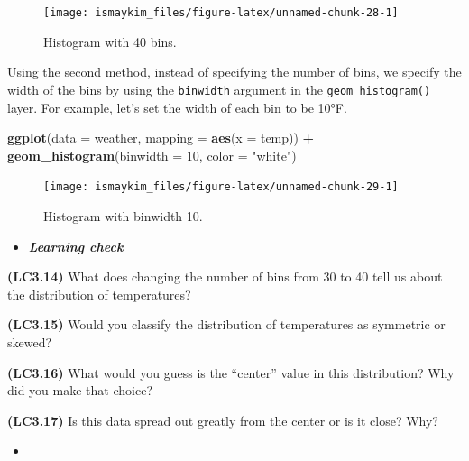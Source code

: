 \documentclass[12pt, krantz2,]{krantz}
\makeatletter
\newenvironment{Shaded}{\begin{snugshade}}{\end{snugshade}}
\newcommand{\DataTypeTok}[1]{\textcolor[rgb]{0.27,0.27,0.27}{#1}}
\newcommand{\DecValTok}[1]{\textcolor[rgb]{0.06,0.06,0.06}{#1}}
\newcommand{\KeywordTok}[1]{\textcolor[rgb]{0.27,0.27,0.27}{\textbf{#1}}}
\newcommand{\NormalTok}[1]{#1}
\newcommand{\OperatorTok}[1]{\textcolor[rgb]{0.43,0.43,0.43}{\textbf{#1}}}
\newcommand{\StringTok}[1]{\textcolor[rgb]{0.5,0.5,0.5}{#1}}
\newenvironment{kframe}{%
\medskip{}
\setlength{\fboxsep}{.8em}
 \def\at@end@of@kframe{}%
 \ifinner\ifhmode%
  \def\at@end@of@kframe{\end{minipage}}%
  \begin{minipage}{\columnwidth}%
 \fi\fi%
 \def\FrameCommand##1{\hskip\@totalleftmargin \hskip-\fboxsep
 \colorbox{shadecolor}{##1}\hskip-\fboxsep
     \hskip-\linewidth \hskip-\@totalleftmargin \hskip\columnwidth}%
 \MakeFramed {\advance\hsize-\width
   \@totalleftmargin\z@ \linewidth\hsize
   \@setminipage}}%
 {\par\unskip\endMakeFramed%
 \at@end@of@kframe}
\renewenvironment{Shaded}{\begin{kframe}}{\end{kframe}}
\newenvironment{rmdblock}[1]
  {\begin{shaded*}
  \begin{itemize}
  \renewcommand{\labelitemi}{
    \raisebox{-.7\height}[0pt][0pt]{
    }
  }
  \item
  }
  {
  \end{itemize}
  \end{shaded*}
  }
\newenvironment{learncheck}
  {\begin{rmdblock}{warning}}
  {\end{rmdblock}}
\makeatother
\begin{document}
\begin{figure}

{\centering \texttt{[image: ismaykim\_files/figure-latex/unnamed-chunk-28-1]} 

}

\caption{Histogram with 40 bins.}\label{fig:unnamed-chunk-28}
\end{figure}

Using the second method, instead of specifying the number of bins, we specify the width of the bins by using the \texttt{binwidth} argument in the \texttt{geom\_histogram()} layer. For example, let's set the width of each bin to be 10°F.

\begin{Shaded}
\begin{Highlighting}[]
\KeywordTok{ggplot}\NormalTok{(}\DataTypeTok{data =}\NormalTok{ weather, }\DataTypeTok{mapping =} \KeywordTok{aes}\NormalTok{(}\DataTypeTok{x =}\NormalTok{ temp)) }\OperatorTok{+}
\StringTok{  }\KeywordTok{geom_histogram}\NormalTok{(}\DataTypeTok{binwidth =} \DecValTok{10}\NormalTok{, }\DataTypeTok{color =} \StringTok{"white"}\NormalTok{)}
\end{Highlighting}
\end{Shaded}

\begin{figure}

{\centering \texttt{[image: ismaykim\_files/figure-latex/unnamed-chunk-29-1]} 

}

\caption{Histogram with binwidth 10.}\label{fig:unnamed-chunk-29}
\end{figure}

\begin{learncheck}
\textbf{\emph{Learning check}}
\end{learncheck}

\textbf{(LC3.14)} What does changing the number of bins from 30 to 40 tell us about the distribution of temperatures?

\textbf{(LC3.15)} Would you classify the distribution of temperatures as symmetric or skewed?

\textbf{(LC3.16)} What would you guess is the ``center'' value in this distribution? Why did you make that choice?

\textbf{(LC3.17)} Is this data spread out greatly from the center or is it close? Why?

\begin{learncheck}

\end{learncheck}
\end{document}
